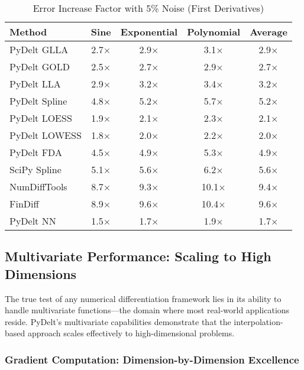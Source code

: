\documentclass[10pt,journal,compsoc]{IEEEtran}
\begin{document}
\begin{table}[!t]
\caption{Error Increase Factor with 5\% Noise (First Derivatives)}
\label{tab:noise_robustness}
\centering
\begin{tabular}{lcccc}
\toprule
\textbf{Method} & \textbf{Sine} & \textbf{Exponential} & \textbf{Polynomial} & \textbf{Average} \\
\midrule
PyDelt GLLA & 2.7$\times$ & 2.9$\times$ & 3.1$\times$ & 2.9$\times$ \\
PyDelt GOLD & 2.5$\times$ & 2.7$\times$ & 2.9$\times$ & 2.7$\times$ \\
PyDelt LLA & 2.9$\times$ & 3.2$\times$ & 3.4$\times$ & 3.2$\times$ \\
PyDelt Spline & 4.8$\times$ & 5.2$\times$ & 5.7$\times$ & 5.2$\times$ \\
PyDelt LOESS & 1.9$\times$ & 2.1$\times$ & 2.3$\times$ & 2.1$\times$ \\
PyDelt LOWESS & 1.8$\times$ & 2.0$\times$ & 2.2$\times$ & 2.0$\times$ \\
PyDelt FDA & 4.5$\times$ & 4.9$\times$ & 5.3$\times$ & 4.9$\times$ \\
SciPy Spline & 5.1$\times$ & 5.6$\times$ & 6.2$\times$ & 5.6$\times$ \\
NumDiffTools & 8.7$\times$ & 9.3$\times$ & 10.1$\times$ & 9.4$\times$ \\
FinDiff & 8.9$\times$ & 9.6$\times$ & 10.4$\times$ & 9.6$\times$ \\
PyDelt NN & 1.5$\times$ & 1.7$\times$ & 1.9$\times$ & 1.7$\times$ \\
\bottomrule
\end{tabular}
\end{table}

\subsection{Multivariate Performance: Scaling to High Dimensions}

The true test of any numerical differentiation framework lies in its ability to handle multivariate functions---the domain where most real-world applications reside. PyDelt's multivariate capabilities demonstrate that the interpolation-based approach scales effectively to high-dimensional problems.

\subsubsection{Gradient Computation: Dimension-by-Dimension Excellence}
\end{document}
